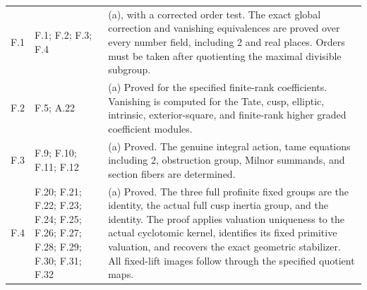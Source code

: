 \begin{longtable}{@{}p{1.1cm}p{3.0cm}p{10.3cm}@{}}
F.1 & F.1; F.2; F.3; F.4 & (a), with a corrected order test. The exact global correction and vanishing equivalences are proved over every number field, including 2 and real places. Orders must be taken after quotienting the maximal divisible subgroup. \\
F.2 & F.5; A.22 & (a) Proved for the specified finite-rank coefficients. Vanishing is computed for the Tate, cusp, elliptic, intrinsic, exterior-square, and finite-rank higher graded coefficient modules. \\
F.3 & F.9; F.10; F.11; F.12 & (a) Proved. The genuine integral action, tame equations including 2, obstruction group, Milnor summands, and section fibers are determined. \\
F.4 & F.20; F.21; F.22; F.23; F.24; F.25; F.26; F.27; F.28; F.29; F.30; F.31; F.32 & (a) Proved. The three full profinite fixed groups are the identity, the actual full cusp inertia group, and the identity. The proof applies valuation uniqueness to the actual cyclotomic kernel, identifies its fixed primitive valuation, and recovers the exact geometric stabilizer. All fixed-lift images follow through the specified quotient maps. \\
\bottomrule\end{longtable}
